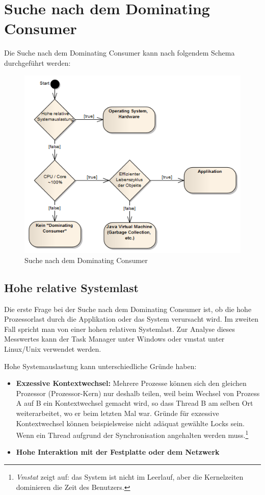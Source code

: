 \section{Suche nach dem Dominating Consumer}\label{dominating_consumer}
Die Suche nach dem Dominating Consumer kann nach folgendem Schema durchgeführt werden:
\begin{figure}[H]
  	\centering
    	\includegraphics[width=13.1cm]{images/dominating_consumer}
        	\caption{Suche nach dem Dominating Consumer}
\end{figure}

\subsection{Hohe relative Systemlast}\label{hohe_systemauslastung}
Die erste Frage bei der Suche nach dem Dominating Consumer  ist, ob die hohe Prozessorlast durch die Applikation oder das System verursacht wird. Im zweiten Fall spricht man von einer hohen relativen Systemlast. Zur Analyse dieses Messwertes kann der Task Manager unter Windows oder vmstat unter Linux/Unix verwendet werden.\newline 

Hohe Systemauslastung kann unterschiedliche Gründe haben: 
\begin{itemize}
\item \textbf{Exzessive Kontextwechsel:} Mehrere Prozesse können sich den gleichen Prozessor (Prozessor-Kern) nur deshalb teilen, weil beim Wechsel von Prozess A auf B ein Kontextwechsel gemacht wird, so dass Thread B am selben Ort weiterarbeitet, wo er beim letzten Mal war. Gründe für exzessive Kontextwechsel können beispielsweise nicht adäquat gewählte Locks sein. Wenn ein Thread aufgrund der Synchronisation angehalten werden muss.\footnote{\textit{Vmstat} zeigt auf: das System ist nicht im Leerlauf, aber die Kernelzeiten dominieren die Zeit des Benutzers.}
\item \textbf{Hohe Interaktion mit der Festplatte oder dem Netzwerk} 
\end{itemize}


